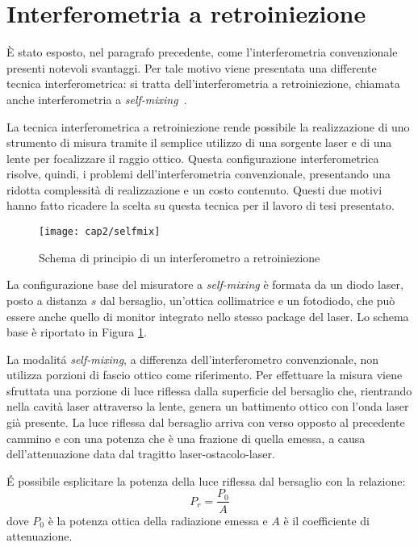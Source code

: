 \section{Interferometria a retroiniezione}
È stato esposto, nel paragrafo precedente, come l'interferometria convenzionale presenti notevoli svantaggi. Per tale motivo viene presentata una differente tecnica interferometrica: si tratta dell'interferometria a retroiniezione, chiamata anche interferometria a \textit{self-mixing}~\cite{1464-4258-4-6-371}.

La tecnica interferometrica a retroiniezione rende possibile la realizzazione di uno strumento di misura tramite il semplice utilizzo di una sorgente laser e di una lente per focalizzare il raggio ottico. Questa configurazione interferometrica risolve, quindi, i problemi dell'interferometria convenzionale, presentando una ridotta complessità di realizzazione e un costo contenuto. Questi due motivi hanno fatto ricadere la scelta su questa tecnica per il lavoro di tesi presentato.

\begin{figure}[H]
  \begin{center}
    \texttt{[image: cap2/selfmix]}
    \caption{Schema di principio di un interferometro a retroiniezione}
    \label{selfmix}
  \end{center}
\end{figure}

La configurazione base del misuratore a \textit{self-mixing} è formata da un diodo laser, posto a distanza $s$ dal bersaglio, un'ottica collimatrice e un fotodiodo, che può essere anche quello di monitor integrato nello stesso package del laser. Lo schema base è riportato in Figura \ref{selfmix}.

La modalitá \textit{self-mixing}, a differenza dell'interferometro convenzionale, non utilizza porzioni di fascio ottico come riferimento. Per effettuare la misura viene sfruttata una porzione di luce riflessa dalla superficie del bersaglio che, rientrando nella cavità laser attraverso la lente, genera un battimento ottico con l'onda laser già presente. La luce riflessa dal bersaglio arriva con verso opposto al precedente cammino e con una potenza che è una frazione di quella emessa, a causa dell'attenuazione data dal tragitto laser-ostacolo-laser.

\'E possibile esplicitare la potenza della luce riflessa dal bersaglio con la relazione:
\begin{equation}
	P_r=\frac{P_0}{A}
\end{equation}
dove $P_0$ è la potenza ottica della radiazione emessa e $A$ è il coefficiente di attenuazione.

